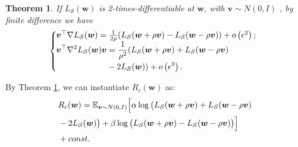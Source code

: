 \documentclass[letterpaper]{article} %
\theoremstyle{plain}
\newtheorem{theorem}{Theorem}
\theoremstyle{definition}
\begin{document}
\begin{theorem} \label{theorem:fd}
If $L_{\mathcal{S}}(\boldsymbol{w})$ is 2-times-differentiable at $\boldsymbol{w}$, with $\boldsymbol{v} \sim N(0, I)$ , by finite difference we have
\begin{equation*}
\left\{\begin{array}{l}
\hspace{-0.2cm}\boldsymbol{v}^{\top} \nabla L_{\mathcal{S}}(\boldsymbol{w}) =\frac{1}{2\rho} (L_{\mathcal{S}}(\boldsymbol{w} + \rho\boldsymbol{v})- L_{\mathcal{S}}(\boldsymbol{w} - \rho\boldsymbol{v}))+o\left(\epsilon^2\right) ; \\

\begin{aligned}
\hspace{-0.2cm}\boldsymbol{v}^{\top} \nabla^2 L_{\mathcal{S}}(\boldsymbol{w}) \boldsymbol{v} &= \frac{1}{\rho^2} (L_{\mathcal{S}}(\boldsymbol{w}+\rho\boldsymbol{v})+L_{\mathcal{S}}(\boldsymbol{w}-\rho\boldsymbol{v}) \\
&-2 L_{\mathcal{S}}(\boldsymbol{w}))+o\left(\epsilon^3\right).
\end{aligned}
\end{array}\right.
\end{equation*}
\end{theorem}

By Theorem \ref{theorem:fd}, we can instantiate $R_c(\boldsymbol{w})$ as:
\begin{align}\label{eq:R_c_fd}
&R_c(\boldsymbol{w}) =\mathbb{E}_{\boldsymbol{v} \sim N(0, I)} \Big[\alpha \log\big(L_{\mathcal{S}}(\boldsymbol{w}+\rho\boldsymbol{v})+L_{\mathcal{S}}(\boldsymbol{w}-\rho\boldsymbol{v}) \notag\\
&-2 L_{\mathcal{S}}(\boldsymbol{w})\big)
+ \beta \log\big( L_{\mathcal{S}}(\boldsymbol{w} + \rho\boldsymbol{v})-L_{\mathcal{S}}(\boldsymbol{w} - \rho\boldsymbol{v})\big)\Big] \notag\\
&+ const.
\end{align}
\end{document}
